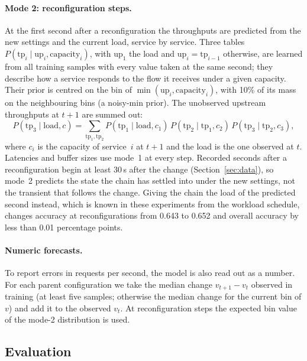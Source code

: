 \paragraph{Mode 2: reconfiguration steps.}
At the first second after a reconfiguration the throughputs are predicted from the new settings and the current load, service by service.
Three tables $P(\mathrm{tp}_i \mid \mathrm{up}_i, \mathrm{capacity}_i)$, with $\mathrm{up}_1$ the load and $\mathrm{up}_i = \mathrm{tp}_{i-1}$ otherwise, are learned from all training samples with every value taken at the same second; they describe how a service responds to the flow it receives under a given capacity.
Their prior is centred on the bin of $\min(\mathrm{up}_i, \mathrm{capacity}_i)$, with 10\% of its mass on the neighbouring bins (a noisy-min prior).
The unobserved upstream throughputs at $t+1$ are summed out:
\begin{equation}
  P(\mathrm{tp}_3 \mid \mathrm{load}, c) = \sum_{\mathrm{tp}_1, \mathrm{tp}_2}
  P(\mathrm{tp}_1 \mid \mathrm{load}, c_1)\, P(\mathrm{tp}_2 \mid \mathrm{tp}_1, c_2)\, P(\mathrm{tp}_3 \mid \mathrm{tp}_2, c_3),
\end{equation}
where $c_i$ is the capacity of service~$i$ at $t+1$ and the load is the one observed at $t$.
Latencies and buffer sizes use mode~1 at every step.
Recorded seconds after a reconfiguration begin at least 30\,s after the change (Section~\ref{sec:data}), so mode~2 predicts the state the chain has settled into under the new settings, not the transient that follows the change.
Giving the chain the load of the predicted second instead, which is known in these experiments from the workload schedule, changes accuracy at reconfigurations from 0.643 to 0.652 and overall accuracy by less than 0.01 percentage points.

\paragraph{Numeric forecasts.}
To report errors in requests per second, the model is also read out as a number.
For each parent configuration we take the median change $v_{t+1} - v_t$ observed in training (at least five samples; otherwise the median change for the current bin of $v$) and add it to the observed $v_t$.
At reconfiguration steps the expected bin value of the mode-2 distribution is used.

\subsection{Evaluation}
\label{sec:evaluation}

